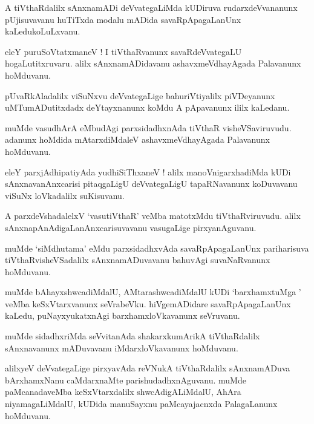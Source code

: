 \documentclass{article}
\begin{document}
\begin{mn}
A tiVthaRdalilx sAnxnamADi deVvategaLiMda  kUDiruva rudarxdeVvananunx pUjisuvavanu huTiTxda modalu
mADida savaRpApagaLanUnx kaLedukoLuLxvanu.
\end{mn}

\begin{mn}
eleY puruSoVtatxmaneV ! I tiVthaRvanunx savaRdeVvategaLU hogaLutitxruvaru. alilx sAnxnamADidavanu 
ashavxmeVdhayAgada Palavanunx hoMduvanu.
\end{mn}

\begin{mn}
pUvaRkAladalilx viSuNxvu deVvategaLige bahuriVtiyalilx  piVDeyanunx  uMTumADutitxdadx 
deYtayxnanunx koMdu A pApavanunx ililx kaLedanu. 
\end{mn}

\begin{mn}
muMde vasudhArA eMbudAgi parxsidadhxnAda tiVthaR visheVSaviruvudu. adanunx  hoMdida mAtarxdiMdaleV 
ashavxmeVdhayAgada Palavanunx hoMduvanu.
\end{mn}

\begin{mn}
eleY parxjAdhipatiyAda yudhiSiThxaneV ! alilx manoVnigarxhadiMda kUDi sAnxnavanAnxcarisi  
pitaqgaLigU deVvategaLigU tapaRNavanunx koDuvavanu viSuNx loVkadalilx suKisuvanu.
\end{mn}

\begin{mn}
A parxdeVshadalelxV `vasutiVthaR' veMba matotxMdu tiVthaRviruvudu. alilx 
sAnxnapAnAdigaLanAnxcarisuvavanu vasugaLige pirxyanAguvanu.
\end{mn}

\begin{mn}
muMde `siMdhutama' eMdu parxsidadhxvAda savaRpApagaLanUnx pariharisuva tiVthaRvisheVSadalilx 
sAnxnamADuvavanu bahuvAgi suvaNaRvanunx hoMduvanu.
\end{mn}

\begin{mn}
muMde bAhayxshwcadiMdalU, AMtarashwcadiMdalU kUDi `barxhamxtuMga ' veMba keSxVtarxvanunx seVrabeVku.
hiVgemADidare savaRpApagaLanUnx kaLedu, puNayxyukatxnAgi barxhamxloVkavanunx  seVruvanu.
\end{mn}

\begin{mn}
muMde sidadhxriMda seVvitanAda shakarxkumArikA tiVthaRdalilx sAnxnavanunx mADuvavanu 
iMdarxloVkavanunx hoMduvanu.
\end{mn}

\begin{mn}
alilxyeV deVvategaLige pirxyavAda reVNukA tiVthaRdalilx sAnxnamADuva bArxhamxNanu caMdarxnaMte 
parishudadhxnAguvanu. muMde paMcanadaveMba keSxVtarxdalilx shwcAdigALiMdalU, AhAra niyamagaLiMdalU,
kUDida manuSayxnu paMcayajacnxda PalagaLanunx hoMduvanu.
\end{mn}
\end{document}
